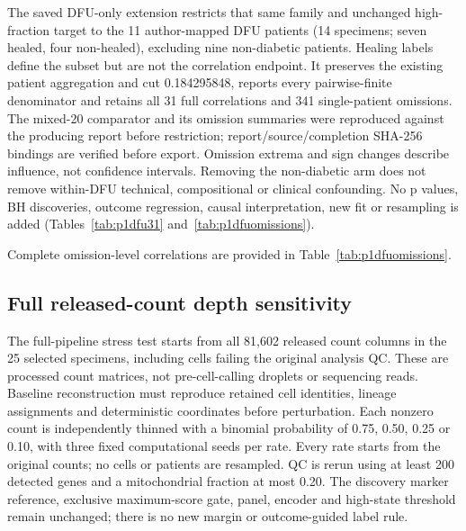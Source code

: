 \documentclass[10pt,a4paper]{article}
\begin{document}
The saved DFU-only extension restricts that same family and unchanged high-fraction target to the 11 author-mapped DFU patients (14 specimens; seven healed, four non-healed), excluding nine non-diabetic patients. Healing labels define the subset but are not the correlation endpoint. It preserves the existing patient aggregation and cut 0.184295848, reports every pairwise-finite denominator and retains all 31 full correlations and 341 single-patient omissions. The mixed-20 comparator and its omission summaries were reproduced against the producing report before restriction; report/source/completion SHA-256 bindings are verified before export. Omission extrema and sign changes describe influence, not confidence intervals. Removing the non-diabetic arm does not remove within-DFU technical, compositional or clinical confounding. No p values, BH discoveries, outcome regression, causal interpretation, new fit or resampling is added (Tables~\ref{tab:p1dfu31} and~\ref{tab:p1dfuomissions}).

Complete omission-level correlations are provided in Table~\ref{tab:p1dfuomissions}.

\subsection{Full released-count depth sensitivity}
The full-pipeline stress test starts from all 81,602 released count columns in the 25 selected specimens, including cells failing the original analysis QC. These are processed count matrices, not pre-cell-calling droplets or sequencing reads. Baseline reconstruction must reproduce retained cell identities, lineage assignments and deterministic coordinates before perturbation. Each nonzero count is independently thinned with a binomial probability of 0.75, 0.50, 0.25 or 0.10, with three fixed computational seeds per rate. Every rate starts from the original counts; no cells or patients are resampled. QC is rerun using at least 200 detected genes and a mitochondrial fraction at most 0.20. The discovery marker reference, exclusive maximum-score gate, panel, encoder and high-state threshold remain unchanged; there is no new margin or outcome-guided label rule.
\end{document}
